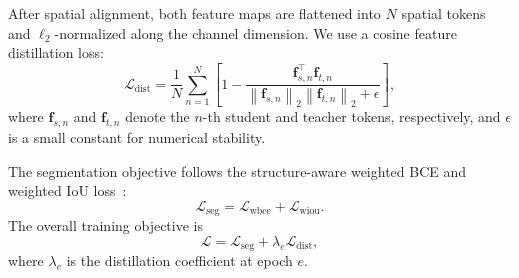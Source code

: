 After spatial alignment, both feature maps are flattened into $N$ spatial tokens and $\ell_2$-normalized along the channel dimension. We use a cosine feature distillation loss:
\begin{equation}
\mathcal{L}_{\mathrm{dist}}
=
\frac{1}{N}\sum_{n=1}^{N}
\left[
1-
\frac{
\mathbf{f}_{s,n}^{\top}\mathbf{f}_{t,n}
}{
\left\|\mathbf{f}_{s,n}\right\|_2
\left\|\mathbf{f}_{t,n}\right\|_2
+\epsilon
}
\right],
\end{equation}
where $\mathbf{f}_{s,n}$ and $\mathbf{f}_{t,n}$ denote the $n$-th student and teacher tokens, respectively, and $\epsilon$ is a small constant for numerical stability.

The segmentation objective follows the structure-aware weighted BCE and weighted IoU loss~\cite{fan2020pranet}:
\begin{equation}
\mathcal{L}_{\mathrm{seg}}
=
\mathcal{L}_{\mathrm{wbce}}
+
\mathcal{L}_{\mathrm{wiou}}.
\end{equation}
The overall training objective is
\begin{equation}
\mathcal{L}
=
\mathcal{L}_{\mathrm{seg}}
+
\lambda_e\mathcal{L}_{\mathrm{dist}},
\end{equation}
where $\lambda_e$ is the distillation coefficient at epoch $e$.


